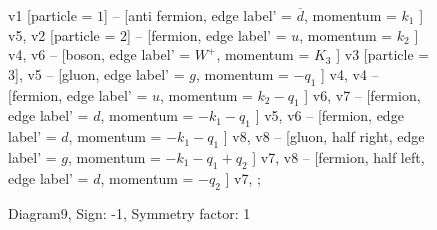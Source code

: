 \documentclass{revtex4}
\begin{document}
\begin{figure}[!htb]
\begin{center}
{    %
v1 [particle = \(1\)] -- [anti fermion, edge label' = \(\overline{d}\), momentum = \(k_{1}\) ] v5, 
v2 [particle = \(2\)] -- [fermion, edge label' = \(u\), momentum = \(k_{2}\) ] v4, 
v6 -- [boson, edge label' = \(W^{+}\), momentum = \(K_{3}\) ] v3 [particle = \(3\)], 
v5 -- [gluon, edge label' = \(g\), momentum = \(-q_{1}\) ] v4, 
v4 -- [fermion, edge label' = \(u\), momentum = \(k_{2} - q_{1}\) ] v6, 
v7 -- [fermion, edge label' = \(d\), momentum = \(-k_{1} - q_{1}\) ] v5, 
v6 -- [fermion, edge label' = \(d\), momentum = \(-k_{1} - q_{1}\) ] v8, 
v8 -- [gluon, half right, edge label' = \(g\), momentum = \(-k_{1} - q_{1} + q_{2}\) ] v7, 
v8 -- [fermion, half left, edge label' = \(d\), momentum = \(-q_{2}\) ] v7, 
};
\end{center}
\caption{Diagram9, Sign: -1, Symmetry factor: 1}
\end{figure}
\newpage
\end{document}
